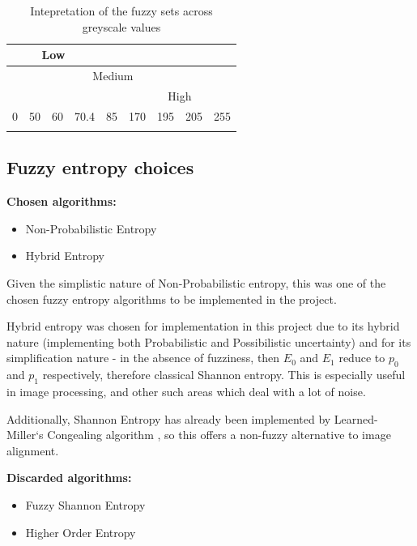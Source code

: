 \begin{table}
  \center
  \begin{tabular}{ |l|l|l|l|l|l|l|l|l| }
    \hline
    \multicolumn{4}{|c|}{Low} & \multicolumn{5}{|c|}{} \\
    \hline
    \multicolumn{2}{|c|}{} & \multicolumn{5}{|c|}{Medium} & \multicolumn{2}{|c|}{}  \\
    \hline
    \multicolumn{5}{|c|}{} & \multicolumn{4}{|c|}{High} \\
    \hline
    0 & 50 & 60 & 70.4 & 85 & 170 & 195 & 205 & 255 \\
    \hline
    \cellcolor[gray]{0} & \cellcolor[gray]{0.19} & \cellcolor[gray]{0.24} & \cellcolor[gray]{0.28} & \cellcolor[gray]{0.33} & \cellcolor[gray]{0.66} & \cellcolor[gray]{0.76} & \cellcolor[gray]{0.8} & \cellcolor[gray]{1} \\ \hline
  \end{tabular}
\caption{Intepretation of the fuzzy sets across greyscale values}
\label{table:values}
\end{table}

\subsection{Fuzzy entropy choices}

\textbf{Chosen algorithms:}
\begin{itemize}
  \item Non-Probabilistic Entropy
  \item Hybrid Entropy
\end{itemize}

Given the simplistic nature of Non-Probabilistic entropy, this was one of the chosen fuzzy entropy algorithms to be implemented in the project.

Hybrid entropy was chosen for implementation in this project due to its hybrid nature (implementing both Probabilistic and Possibilistic uncertainty) and for its simplification nature - in the absence of fuzziness, then $E_0$ and $E_1$ reduce to $p_0$ and $p_1$ respectively, therefore classical Shannon entropy. This is especially useful in image processing, and other such areas which deal with a lot of noise.

Additionally, Shannon Entropy has already been implemented by Learned-Miller`s Congealing algorithm \cite{joint-alignment}, so this offers a non-fuzzy alternative to image alignment.

\textbf{Discarded algorithms:}
\begin{itemize}
  \item Fuzzy Shannon Entropy
  \item Higher Order Entropy
\end{itemize}

